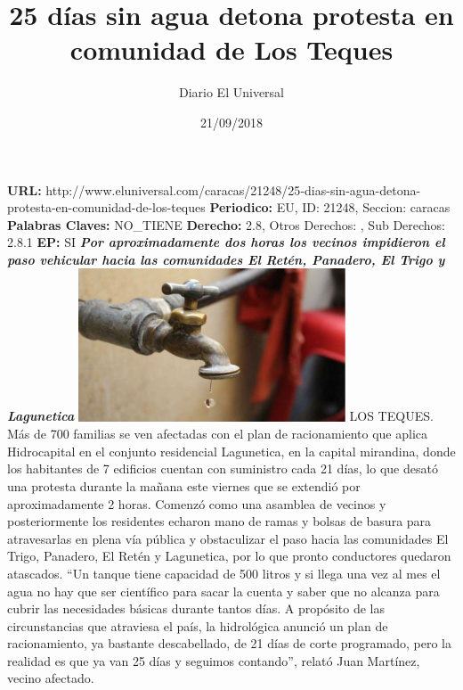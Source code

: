 \documentclass{article}%
\title{\textbf{25 días sin agua detona protesta en comunidad de Los Teques}}%
\author{Diario El Universal}%
\date{21/09/2018}%
\begin{document}
%
\normalsize%
\maketitle%
\textbf{URL: }%
http://www.eluniversal.com/caracas/21248/25{-}dias{-}sin{-}agua{-}detona{-}protesta{-}en{-}comunidad{-}de{-}los{-}teques\newline%
%
\textbf{Periodico: }%
EU, %
ID: %
21248, %
Seccion: %
caracas\newline%
%
\textbf{Palabras Claves: }%
NO\_TIENE\newline%
%
\textbf{Derecho: }%
2.8, %
Otros Derechos: %
, %
Sub Derechos: %
2.8.1\newline%
%
\textbf{EP: }%
SI\newline%
\newline%
%
\textbf{\textit{Por aproximadamente dos horas los vecinos impidieron el paso vehicular hacia las comunidades El Retén,  Panadero, El Trigo y Lagunetica}}%
\newline%
\newline%
%
\includegraphics[width=300px]{231.jpg}%
\newline%
%
LOS TEQUES.  Más de 700 familias se ven afectadas con el plan de racionamiento que aplica Hidrocapital en el conjunto residencial Lagunetica, en la capital mirandina, donde los habitantes de 7 edificios cuentan con suministro cada 21 días, lo que desató una protesta durante la mañana este viernes que se extendió por aproximadamente 2 horas.%
\newline%
%
Comenzó como una asamblea de vecinos y posteriormente los residentes echaron mano de ramas y bolsas de basura para atravesarlas en plena vía pública y obstaculizar el paso hacia las comunidades El Trigo, Panadero, El Retén y Lagunetica, por lo que pronto conductores quedaron atascados.%
\newline%
%
“Un tanque tiene capacidad de 500 litros y si llega una vez al mes el agua no hay que ser científico para sacar la cuenta y saber que no alcanza para cubrir las necesidades básicas durante tantos días. A propósito de las circunstancias que atraviesa el país, la hidrológica anunció un plan de racionamiento, ya bastante descabellado, de 21 días de corte programado, pero la realidad es que ya van 25 días y seguimos contando”, relató Juan Martínez, vecino afectado.%
\end{document}
